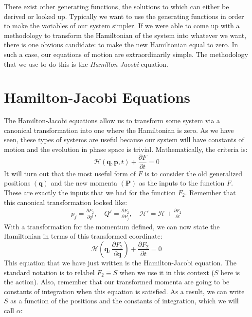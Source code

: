 There exist other generating functions, the solutions to which can either be derived or looked up. Typically we want to use the generating functions in order to make the variables of our system simpler. If we were able to come up with a methodology to transform the \gls{Hamiltonian} of the system into whatever we want, there is one obvious candidate: to make the new \gls{Hamiltonian} equal to zero. In such a case, our equations of motion are extraordinarily simple. The methodology that we use to do this is the \textit{Hamilton-Jacobi} equation.

\section{Hamilton-Jacobi Equations}
The Hamilton-Jacobi equations allow us to transform some system via a canonical transformation into one where the Hamiltonian is zero. As we have seen, these types of systems are useful because our system will have constants of motion and the evolution in phase space is trivial. Mathematically, the criteria is:
$$\mathcal{H}(\bm{q},\bm{p},t)+\frac{\partial F}{\partial t}=0$$
It will turn out that the most useful form of $F$ is to consider the old generalized positions $(\bm{q})$ and the new momenta $(\bm{P})$ as the inputs to the function $F$. These are exactly the inputs that we had for the function $F_2$. Remember that this canonical transformation looked like:
\begin{gather}
p_j=\frac{\partial F_2}{\partial q^j},\quad Q^j=\frac{\partial F_2}{\partial P_j}, \quad \mathcal{H}'=\mathcal{H}+\frac{\partial F_2}{\partial t}
\end{gather}
With a transformation for the momentum defined, we can now state the \gls{Hamiltonian} in terms of this transformed coordinate:
$$\mathcal{H}\left(\bm{q},\frac{\partial F_2}{\partial \bm{q}}\right)+\frac{\partial F_2}{\partial t}=0$$
This equation that we have just written is the Hamilton-Jacobi equation. The standard notation is to relabel $F_2\equiv S$ when we use it in this context ($S$ here is the action). Also, remember that our transformed momenta are going to be constants of integration when this equation is satisfied. As a result, we can write $S$ as a function of the positions and the constants of integration, which we will call $\alpha$:
